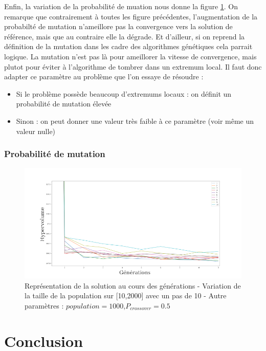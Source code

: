 \documentclass[12pt]{report}
\begin{document}
      Enfin, la variation de la probabilité de muation nous donne la figure \ref{sch_mutation_moy}. On remarque que contrairement à toutes les figure précédentes, l'augmentation de la probabilté de mutation n'ameillore pas la convergence vers la solution de référence, mais que au contraire elle la dégrade. Et d'ailleur, si on reprend la définition de la mutation dans les cadre des algorithmes génétiques cela parrait logique. La mutation n'est pas là pour ameillorer la vitesse de convergence, mais plutot pour éviter à l'algorithme de tombrer dans un extremum local.
      Il faut donc adapter ce paramètre au problème que l'on essaye de résoudre :
      \begin{itemize}
        \item Si le problème possède beaucoup d'extremums locaux : on définit un probabilité de mutation élevée
        \item Sinon : on peut donner une valeur très faible à ce paramètre (voir même un valeur nulle)
      \end{itemize}

      \subsection{Probabilité de mutation}
      \begin{figure}[h]
        \centering
        \includegraphics[width=15cm]{img/DTLZ7_mutation.png}
        \caption{Représentation de la solution au cours des générations - Variation de la taille de la population sur [10,2000] avec un pas de 10 - Autre paramètres : $population = 1000$,$P_{crossover} = 0.5$}
        \label{sch_mutation_moy}
      \end{figure}



  \chapter{Conclusion}
\end{document}
